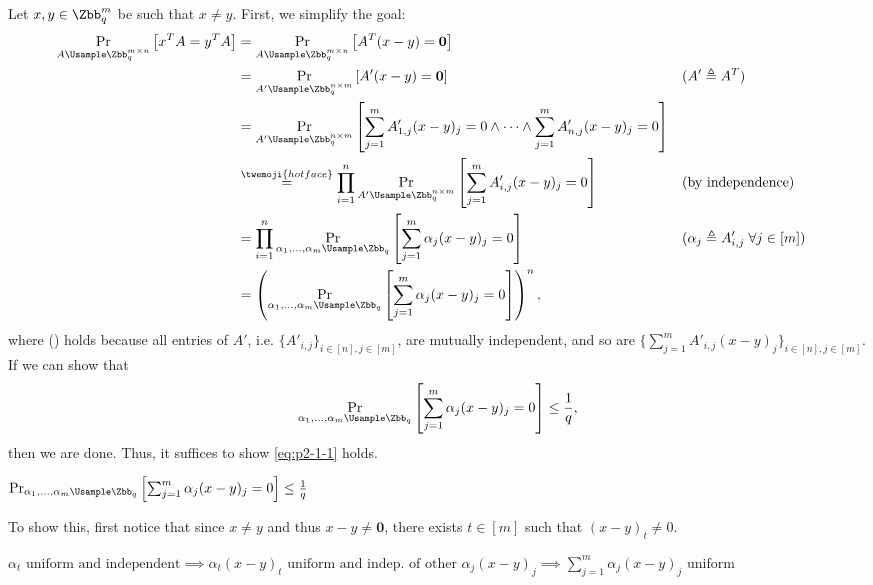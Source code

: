 \begin{answer}[i]
    Let $x,y\in \Zbb_q^m$ be such that $x\ne y$.
    First, we simplify the goal:
    \begin{align*}
         \Pr_{A\Usample \Zbb_q^{m\times n}}\left[x^T A = y^TA\right]
         &=  \Pr_{A\Usample \Zbb_q^{m\times n}}\left[A^T(x-y)= \mathbf{0}\right]\\
         &=  \Pr_{A'\Usample \Zbb_q^{n\times m}}\left[A'(x-y)= \mathbf{0}\right] && (A'\triangleq A^T)\\
         &= \Pr_{A'\Usample \Zbb_q^{n\times m}}\left[\sum_{j=1}^m A'_{1, j}(x-y)_j =0 \land\cdots\land \sum_{j=1}^m A'_{n, j}(x-y)_j=0\right]\\
         &\stackrel{\twemoji{hot face}}=  \prod_{i=1}^n \Pr_{A'\Usample \Zbb_q^{n\times m}}\left[\sum_{j=1}^m A'_{i, j}(x-y)_j=0\right]
         && (\textrm{by independence})\\
         &=  \prod_{i=1}^n \Pr_{\alpha_1,\ldots,\alpha_m \Usample \Zbb_q}\left[\sum_{j=1}^m \alpha_j(x-y)_j=0\right]
         && (\alpha_j \triangleq A'_{i,j} \; \forall j\in [m])\\
         &= \left( \Pr_{\alpha_1,\ldots,\alpha_m \Usample \Zbb_q}\left[\sum_{j=1}^m \alpha_j(x-y)_j=0\right]\right)^n,
    \end{align*}
    where () holds because all entries of $A'$, i.e. $\{A'_{i,j}\}_{i\in [n], j\in [m]}$, are mutually independent, and so are $\{\sum_{j=1}^m A'_{i,j} (x-y)_j\}_{i\in [n], j\in [m]}$.
    If we can show that
    \begin{equation}\label{eq:p2-1-1}
        \Pr_{\alpha_1,\ldots,\alpha_m \Usample \Zbb_q}\left[\sum_{j=1}^m \alpha_j(x-y)_j=0\right] \le \frac{1}{q},
    \end{equation}
    then we are done. Thus, it suffices to show \eqref{eq:p2-1-1} holds.

    \begin{goal}
        $
            \Pr_{\alpha_1,\ldots,\alpha_m \Usample \Zbb_q}\left[\sum_{j=1}^m \alpha_j(x-y)_j=0\right] \le \frac{1}{q}
        $
    \end{goal}

    

    To show this, first notice that since $x\neq y$ and thus $x-y\neq \mathbf{0}$, there exists $t\in [m]$ such that $(x-y)_t\neq 0$.
    \begin{idea}
        $
            \alpha_t\textrm{ uniform and independent}
            \implies \alpha_t(x-y)_t \textrm{ uniform and indep. of other } \alpha_j(x-y)_j
            \implies \sum_{j=1}^m \alpha_j(x-y)_j \textrm{ uniform}
        $
    \end{idea}


\end{answer}
